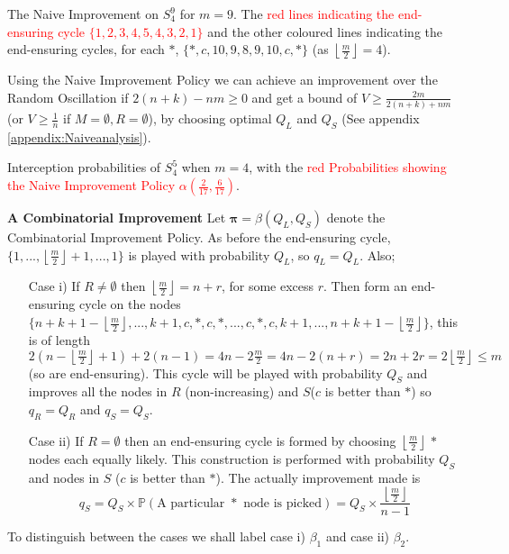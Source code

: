 \documentclass[a4paper,10pt]{article}
\newcommand{\halflength}{\ensuremath{\floor{\frac{m}{2}}}}
\newcommand{\floor}[1]{\left \lfloor #1 \right \rfloor}
\theoremstyle{definition}
\theoremstyle{definition}
\theoremstyle{remark}
\theoremstyle{definition}
\begin{document}
\begin{examplefigure}
\begin{center}
{\begin{tikzpicture}[-,auto,node distance=1.5cm,
                    thick,main node/.style={circle,fill=white,draw,font=\sffamily\Large\bfseries}]
   
\end{tikzpicture}
}
\end{center}
\caption{The Naive Improvement on $S_{4}^{9}$ for $m=9$. The \textcolor{red}{red lines indicating the end-ensuring cycle $\{1,2,3,4,5,4,3,2,1 \}$} and the other coloured lines indicating the end-ensuring cycles, for each $*$, $\{*,c,10,9,8,9,10,c,* \}$ (as $\halflength=4$).}
\end{examplefigure}


Using the Naive Improvement Policy we can achieve an improvement over the Random Oscillation if $2(n+k) -nm \geq 0$ and get a bound of $V \geq \frac{2m}{2(n+k)+nm}$ (or $V \geq \frac{1}{n}$ if $M=\emptyset,R=\emptyset$), by choosing optimal $Q_{L}$ and $Q_{S}$ (See  appendix \ref{appendix:Naiveanalysis}).


\begin{myfigure}
\begin{center}

\end{center}
\caption{Interception probabilities of $S^5_{4}$ when $m=4$, with the \textcolor{red}{red Probabilities showing the Naive Improvement Policy $\alpha \left(\frac{2}{17},\frac{6}{17} \right)$}.}
\end{myfigure}



\textbf{A Combinatorial Improvement}
Let $\bm{\pi}=\beta(Q_{L},Q_{S})$ denote the Combinatorial Improvement Policy.
As before the end-ensuring cycle, $\{ 1,...,\floor{\frac{m}{2}}+1,...,1 \}$ is played with probability $Q_{L}$, so $q_{L}=Q_{L}$. Also;

\begin{enumerate}
\item[Case i)] If $R \neq \emptyset$ then $\floor{\frac{m}{2}}=n+r$, for some excess $r$. Then form an end-ensuring cycle on the nodes $\{ n+k+1-\floor{\frac{m}{2}},...,k+1,c,*,c,*,...,c,*,c,k+1,...,n+k+1-\floor{\frac{m}{2}} \}$, this is of length $2(n-\floor{\frac{m}{2}}+1)+2(n-1)=4n-2 \frac{m}{2}=4n-2(n+r)=2n+2r=2 \floor{\frac{m}{2}} \leq m$ (so are end-ensuring). This cycle will be played with probability $Q_{S}$ and improves all the nodes in $R$ (non-increasing) and $S$($c$ is better than $*$) so $q_{R}=Q_{R}$ and $q_{S}=Q_{S}$.

\item[Case ii)] If $R = \emptyset$ then an end-ensuring cycle is formed by choosing $\halflength$ $*$ nodes each equally likely. This construction is performed with probability $Q_{S}$ and nodes in $S$ ($c$ is better than $*$). The actually improvement made is $$q_{S}=Q_{S} \times \mathbb{P}(\text{A particular } * \text{ node is picked})=Q_{S} \times \frac{\floor{\frac{m}{2}}}{n-1} $$
\end{enumerate}
To distinguish between the cases we shall label case i) $\beta_{1}$ and case ii) $\beta_{2}$.
\end{document}
